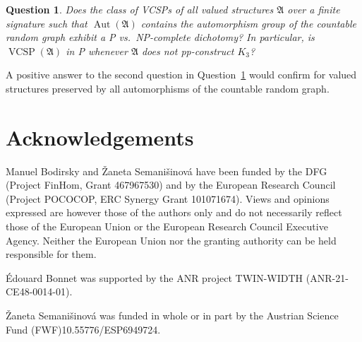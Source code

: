 \documentclass[preprint,12pt]{elsarticle}
\newcommand{\bA}{{\mathfrak A}}
\DeclareMathOperator{\Aut}{Aut}
\DeclareMathOperator{\VCSP}{VCSP}
\newtheorem{question}[theorem]{Question}
\begin{document}
\begin{question}\label{ques:graph}
Does the class of VCSPs of all valued structures $\bA$ over a finite signature such that $\Aut(\bA)$ contains the automorphism group of the countable random graph exhibit a P vs.\ NP-complete dichotomy? In particular, is $\VCSP(\bA)$ in P whenever $\bA$ does not pp-construct $K_3$?
\end{question}
A positive answer to the second question in Question~\ref{ques:graph} would confirm \cite[Conjecture 9.3]{Resilience-VCSPs} for valued structures preserved by all automorphisms of the countable random graph.

\section*{Acknowledgements}
Manuel Bodirsky and \v{Z}aneta Semani\v{s}inov\'{a} have been funded by the DFG (Project FinHom, Grant 467967530) and by the European Research Council (Project POCOCOP, ERC Synergy Grant 101071674). Views and opinions expressed are however those of the authors only and do not necessarily reflect those of the European Union or the European Research Council Executive Agency. Neither the European Union nor the granting authority can be held responsible for them.

\'Edouard Bonnet was supported by the ANR project TWIN-WIDTH (ANR-21-CE48-0014-01).

\v{Z}aneta Semani\v{s}inov\'{a} was funded in whole or in part by the Austrian Science Fund (FWF)10.55776/ESP6949724.





 







\end{document}
